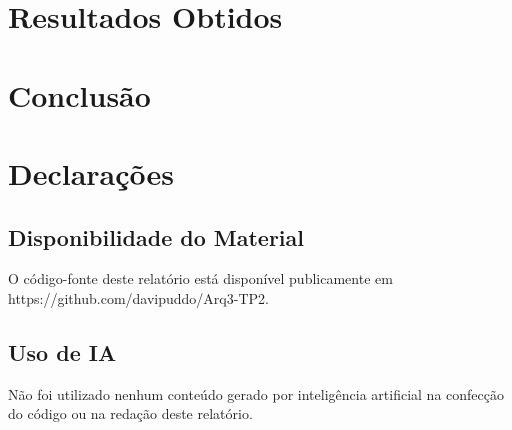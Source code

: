 \documentclass{sbc2023}%
\begin{document}
\section{Resultados Obtidos}

\section{Conclusão}

\section*{Declarações}

\subsection*{Disponibilidade do Material}

O código-fonte deste relatório está disponível publicamente em https://github.com/davipuddo/Arq3-TP2.

\subsection*{Uso de IA}

Não foi utilizado nenhum conteúdo gerado por inteligência artificial na confecção do código ou na redação deste relatório.



\end{document}

